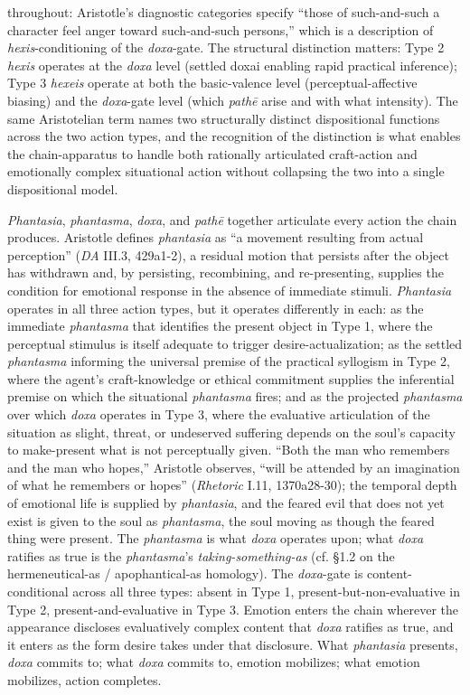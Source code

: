 throughout: Aristotle's diagnostic categories specify ``those of such-and-such a character feel anger toward such-and-such persons,'' which is a description of \textit{hexis}-conditioning of the \textit{doxa}-gate. The structural distinction matters: Type 2 \textit{hexis} operates at the \textit{doxa} level (settled doxai enabling rapid practical inference); Type 3 \textit{hexeis} operate at both the basic-valence level (perceptual-affective biasing) and the \textit{doxa}-gate level (which \textit{pathē} arise and with what intensity). The same Aristotelian term names two structurally distinct dispositional functions across the two action types, and the recognition of the distinction is what enables the chain-apparatus to handle both rationally articulated craft-action and emotionally complex situational action without collapsing the two into a single dispositional model.

\textit{Phantasia}, \textit{phantasma}, \textit{doxa}, and \textit{pathē} together articulate every action the chain produces. Aristotle defines \textit{phantasia} as ``a movement resulting from actual perception'' (\textit{DA} III.3, 429a1-2), a residual motion that persists after the object has withdrawn and, by persisting, recombining, and re-presenting, supplies the condition for emotional response in the absence of immediate stimuli. \textit{Phantasia} operates in all three action types, but it operates differently in each: as the immediate \textit{phantasma} that identifies the present object in Type 1, where the perceptual stimulus is itself adequate to trigger desire-actualization; as the settled \textit{phantasma} informing the universal premise of the practical syllogism in Type 2, where the agent's craft-knowledge or ethical commitment supplies the inferential premise on which the situational \textit{phantasma} fires; and as the projected \textit{phantasma} over which \textit{doxa} operates in Type 3, where the evaluative articulation of the situation as slight, threat, or undeserved suffering depends on the soul's capacity to make-present what is not perceptually given. ``Both the man who remembers and the man who hopes,'' Aristotle observes, ``will be attended by an imagination of what he remembers or hopes'' (\textit{Rhetoric} I.11, 1370a28-30); the temporal depth of emotional life is supplied by \textit{phantasia}, and the feared evil that does not yet exist is given to the soul as \textit{phantasma}, the soul moving as though the feared thing were present. The \textit{phantasma} is what \textit{doxa} operates upon; what \textit{doxa} ratifies as true is the \textit{phantasma}'s \textit{taking-something-as} (cf. \S 1.2 on the hermeneutical-as / apophantical-as homology). The \textit{doxa}-gate is content-conditional across all three types: absent in Type 1, present-but-non-evaluative in Type 2, present-and-evaluative in Type 3. Emotion enters the chain wherever the appearance discloses evaluatively complex content that \textit{doxa} ratifies as true, and it enters as the form desire takes under that disclosure. What \textit{phantasia} presents, \textit{doxa} commits to; what \textit{doxa} commits to, emotion mobilizes; what emotion mobilizes, action completes.


